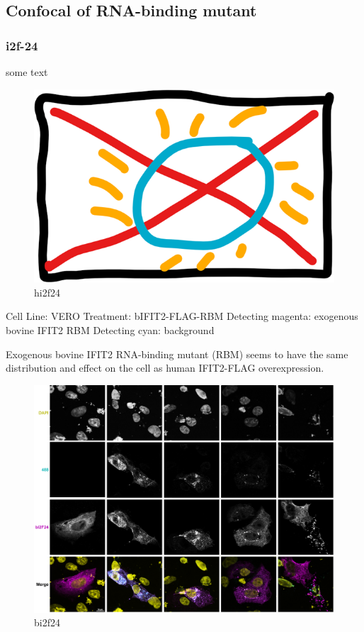 \subsection{Confocal of RNA-binding mutant}
\subsubsection{i2f-24}
some text

\begin{figure}
    \centering
    \includegraphics[width=0.5\linewidth]{10. Chapter 5//Figs//04. IFIT2-mutant confocal/00. placeholder.png}
    \caption[hi2f24]{hi2f24}
    \label{hi2f24}
\end{figure}

Cell Line: VERO
Treatment: bIFIT2-FLAG-RBM
Detecting magenta: exogenous bovine IFIT2 RBM
Detecting cyan: background

Exogenous bovine IFIT2 RNA-binding mutant (RBM) seems to have the same distribution and effect on the cell as human IFIT2-FLAG overexpression.

\begin{figure}
    \centering
    \includegraphics[width=1\linewidth]{10. Chapter 5/Figs/04. IFIT2-mutant confocal/01. bi2f24.png}
    \caption[bi2f24]{bi2f24}
    \label{bi2f24}
\end{figure}


